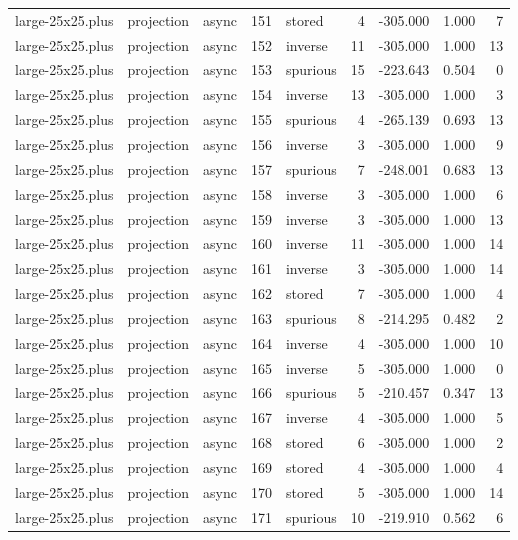 \begin{tabular}{lllrlrrrr}
large-25x25.plus & projection & async & 151 & stored & 4 & -305.000 & 1.000 & 7 \\
large-25x25.plus & projection & async & 152 & inverse & 11 & -305.000 & 1.000 & 13 \\
large-25x25.plus & projection & async & 153 & spurious & 15 & -223.643 & 0.504 & 0 \\
large-25x25.plus & projection & async & 154 & inverse & 13 & -305.000 & 1.000 & 3 \\
large-25x25.plus & projection & async & 155 & spurious & 4 & -265.139 & 0.693 & 13 \\
large-25x25.plus & projection & async & 156 & inverse & 3 & -305.000 & 1.000 & 9 \\
large-25x25.plus & projection & async & 157 & spurious & 7 & -248.001 & 0.683 & 13 \\
large-25x25.plus & projection & async & 158 & inverse & 3 & -305.000 & 1.000 & 6 \\
large-25x25.plus & projection & async & 159 & inverse & 3 & -305.000 & 1.000 & 13 \\
large-25x25.plus & projection & async & 160 & inverse & 11 & -305.000 & 1.000 & 14 \\
large-25x25.plus & projection & async & 161 & inverse & 3 & -305.000 & 1.000 & 14 \\
large-25x25.plus & projection & async & 162 & stored & 7 & -305.000 & 1.000 & 4 \\
large-25x25.plus & projection & async & 163 & spurious & 8 & -214.295 & 0.482 & 2 \\
large-25x25.plus & projection & async & 164 & inverse & 4 & -305.000 & 1.000 & 10 \\
large-25x25.plus & projection & async & 165 & inverse & 5 & -305.000 & 1.000 & 0 \\
large-25x25.plus & projection & async & 166 & spurious & 5 & -210.457 & 0.347 & 13 \\
large-25x25.plus & projection & async & 167 & inverse & 4 & -305.000 & 1.000 & 5 \\
large-25x25.plus & projection & async & 168 & stored & 6 & -305.000 & 1.000 & 2 \\
large-25x25.plus & projection & async & 169 & stored & 4 & -305.000 & 1.000 & 4 \\
large-25x25.plus & projection & async & 170 & stored & 5 & -305.000 & 1.000 & 14 \\
large-25x25.plus & projection & async & 171 & spurious & 10 & -219.910 & 0.562 & 6 \\

\end{tabular}
